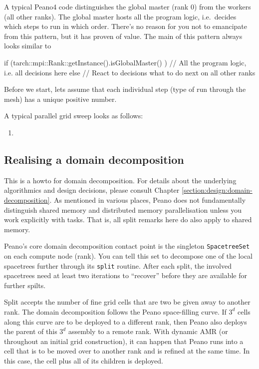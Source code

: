 A typical Peano4 code distinguishes the global master (rank 0) from the workers
(all other ranks).
The global master hosts all the program logic, i.e.~decides which steps to run
in which order.
There's no reason for you not to emancipate from this pattern, but it has proven
of value.
The main of this pattern always looks similar to 
\begin{code}
  if (tarch::mpi::Rank::getInstance().isGlobalMaster() ) {
    // All the program logic, i.e. all decisions here
  }
  else {
    // React to decisions what to do next on all other ranks
  }
\end{code}


Before we start, lets assume that each individual step (type of run through the
mesh) has a unique positive number. 

A typical parallel grid sweep looks as follows:
\begin{enumerate}
  \item 
\end{enumerate} 



\subsection{Realising a domain decomposition}

This is a howto for domain decomposition. 
For details about the underlying algorithmics and design decisions, please
consult Chapter \ref{section:design:domain-decomposition}.
As mentioned in various places, Peano does not fundamentally distinguish shared
memory and distributed memory parallelisation unless you work explicitly with
tasks.
That is, all split remarks here do also apply to shared memory.


Peano's core domain decomposition contact point is the singleton
\texttt{SpacetreeSet} on each compute node (rank).
You can tell this set to decompose one of the local spacetrees further through
its \texttt{split} routine.
After each split, the involved spacetrees need at least two iterations to
``recover'' before they are available for further spilts.


Split accepts the number of fine grid cells that are two be given away to
another rank.
The domain decomposition follows the Peano space-filling curve.
If $3^d$ cells along this curve are to be deployed to a different rank, then
Peano also deploys the parent of this $3^d$ assembly to a remote rank.
With dynamic AMR (or throughout an initial grid construction), it can happen
that Peano runs into a cell that is to be moved over to another rank and is
refined at the same time.
In this case, the cell plus all of its children is deployed.


